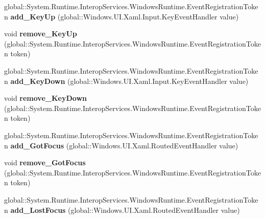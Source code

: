 \begin{DoxyCompactItemize}
global\+::\+System.\+Runtime.\+Interop\+Services.\+Windows\+Runtime.\+Event\+Registration\+Token {\bfseries add\+\_\+\+Key\+Up} (global\+::\+Windows.\+U\+I.\+Xaml.\+Input.\+Key\+Event\+Handler value)
\item 
\mbox{\label{interface_windows_1_1_u_i_1_1_xaml_1_1_i_u_i_element_a5d62f2ed59084c31013a2397faab0314}} 
void {\bfseries remove\+\_\+\+Key\+Up} (global\+::\+System.\+Runtime.\+Interop\+Services.\+Windows\+Runtime.\+Event\+Registration\+Token token)
\item 
\mbox{\label{interface_windows_1_1_u_i_1_1_xaml_1_1_i_u_i_element_a06c59188c0e071badb5405f835fbedd1}} 
global\+::\+System.\+Runtime.\+Interop\+Services.\+Windows\+Runtime.\+Event\+Registration\+Token {\bfseries add\+\_\+\+Key\+Down} (global\+::\+Windows.\+U\+I.\+Xaml.\+Input.\+Key\+Event\+Handler value)
\item 
\mbox{\label{interface_windows_1_1_u_i_1_1_xaml_1_1_i_u_i_element_ae7fc7bcada32e7e554fd3685ee2e4022}} 
void {\bfseries remove\+\_\+\+Key\+Down} (global\+::\+System.\+Runtime.\+Interop\+Services.\+Windows\+Runtime.\+Event\+Registration\+Token token)
\item 
\mbox{\label{interface_windows_1_1_u_i_1_1_xaml_1_1_i_u_i_element_a96e9e3b3d2456f96d2113018911c4223}} 
global\+::\+System.\+Runtime.\+Interop\+Services.\+Windows\+Runtime.\+Event\+Registration\+Token {\bfseries add\+\_\+\+Got\+Focus} (global\+::\+Windows.\+U\+I.\+Xaml.\+Routed\+Event\+Handler value)
\item 
\mbox{\label{interface_windows_1_1_u_i_1_1_xaml_1_1_i_u_i_element_ac7da9e77287c0c2d8bdfd22d90914fb3}} 
void {\bfseries remove\+\_\+\+Got\+Focus} (global\+::\+System.\+Runtime.\+Interop\+Services.\+Windows\+Runtime.\+Event\+Registration\+Token token)
\item 
\mbox{\label{interface_windows_1_1_u_i_1_1_xaml_1_1_i_u_i_element_a8eff735911e4175474bbec6b8aa79b15}} 
global\+::\+System.\+Runtime.\+Interop\+Services.\+Windows\+Runtime.\+Event\+Registration\+Token {\bfseries add\+\_\+\+Lost\+Focus} (global\+::\+Windows.\+U\+I.\+Xaml.\+Routed\+Event\+Handler value)

\end{DoxyCompactItemize}
